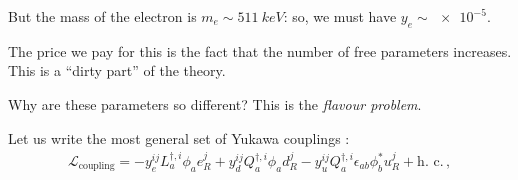\documentclass[main.tex]{subfiles}
\begin{document}
But the mass of the electron is \(m_e \sim \SI{511}{keV}\): so, we must have \(y_e \sim \num{e-5}\). 

The price we pay for this is the fact that the number of free parameters increases. This is a ``dirty part'' of the theory.

Why are these parameters so different? This is the \emph{flavour problem}.


Let us write the most general set of Yukawa couplings \cite[eq.\ 18.24]{peskinConceptsElementaryParticle2019}: 
%
\begin{align}
\mathscr{L} _{\text{coupling}}
= - y^{ij}_{e} L ^{\dag, i}_{a} \phi_{a} e^{j}_{R}
+ y^{ij}_{d} Q ^{\dag, i}_{a} \phi_{a} d^{j}_{R}
- y^{ij}_{u} Q ^{\dag, i}_{a} \epsilon_{ab} \phi_{b}^{*} u^{j}_{R} 
+ \text{h.\ c.}
\,, 
\end{align}
%





\end{document}
